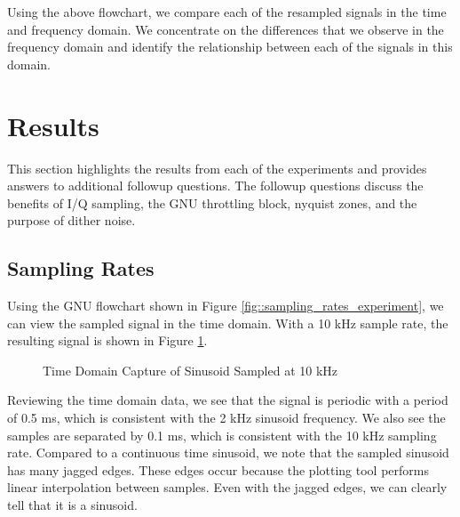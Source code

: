 \documentclass{article}
\begin{document}
Using the above flowchart, we compare each of the resampled signals in the time and frequency domain. We concentrate on the differences that we observe in the frequency domain and identify the relationship between each of the signals in this domain.

\section{Results}

This section highlights the results from each of the experiments and provides answers to additional followup questions. The followup questions discuss the benefits of I/Q sampling, the GNU throttling block, nyquist zones, and the purpose of dither noise.

\subsection{Sampling Rates}

Using the GNU flowchart shown in Figure \ref{fig::sampling_rates_experiment}, we can view the sampled signal in the time domain. With a 10 kHz sample rate, the resulting signal is shown in Figure \ref{fig::sampling_rates_time_domain_10k_samp_rate}.

\begin{figure}[H]
	\centerline{}
	\caption{Time Domain Capture of Sinusoid Sampled at 10 kHz}
	\label{fig::sampling_rates_time_domain_10k_samp_rate}
\end{figure}

Reviewing the time domain data, we see that the signal is periodic with a period of 0.5 ms, which is consistent with the 2 kHz sinusoid frequency. We also see the samples are separated by 0.1 ms, which is consistent with the 10 kHz sampling rate. Compared to a continuous time sinusoid, we note that the sampled sinusoid has many jagged edges. These edges occur because the plotting tool performs linear interpolation between samples. Even with the jagged edges, we can clearly tell that it is a sinusoid.
\end{document}
